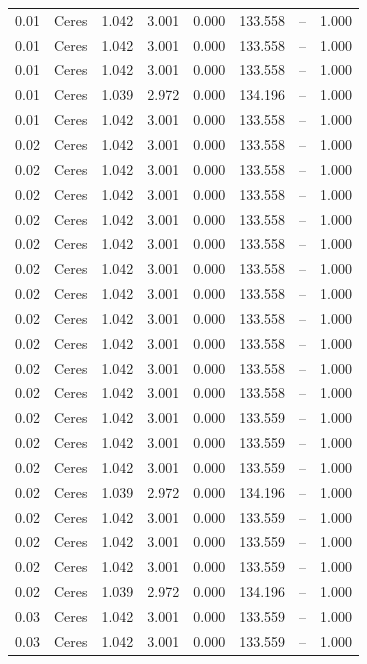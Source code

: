 \begin{table}[H]
\begin{tabular}{l c l l l}
0.01 & Ceres & 1.042 & 3.001 & 0.000 & 133.558 & -- & 1.000 \\
0.01 & Ceres & 1.042 & 3.001 & 0.000 & 133.558 & -- & 1.000 \\
0.01 & Ceres & 1.042 & 3.001 & 0.000 & 133.558 & -- & 1.000 \\
0.01 & Ceres & 1.039 & 2.972 & 0.000 & 134.196 & -- & 1.000 \\
0.01 & Ceres & 1.042 & 3.001 & 0.000 & 133.558 & -- & 1.000 \\
0.02 & Ceres & 1.042 & 3.001 & 0.000 & 133.558 & -- & 1.000 \\
0.02 & Ceres & 1.042 & 3.001 & 0.000 & 133.558 & -- & 1.000 \\
0.02 & Ceres & 1.042 & 3.001 & 0.000 & 133.558 & -- & 1.000 \\
0.02 & Ceres & 1.042 & 3.001 & 0.000 & 133.558 & -- & 1.000 \\
0.02 & Ceres & 1.042 & 3.001 & 0.000 & 133.558 & -- & 1.000 \\
0.02 & Ceres & 1.042 & 3.001 & 0.000 & 133.558 & -- & 1.000 \\
0.02 & Ceres & 1.042 & 3.001 & 0.000 & 133.558 & -- & 1.000 \\
0.02 & Ceres & 1.042 & 3.001 & 0.000 & 133.558 & -- & 1.000 \\
0.02 & Ceres & 1.042 & 3.001 & 0.000 & 133.558 & -- & 1.000 \\
0.02 & Ceres & 1.042 & 3.001 & 0.000 & 133.558 & -- & 1.000 \\
0.02 & Ceres & 1.042 & 3.001 & 0.000 & 133.558 & -- & 1.000 \\
0.02 & Ceres & 1.042 & 3.001 & 0.000 & 133.559 & -- & 1.000 \\
0.02 & Ceres & 1.042 & 3.001 & 0.000 & 133.559 & -- & 1.000 \\
0.02 & Ceres & 1.042 & 3.001 & 0.000 & 133.559 & -- & 1.000 \\
0.02 & Ceres & 1.039 & 2.972 & 0.000 & 134.196 & -- & 1.000 \\
0.02 & Ceres & 1.042 & 3.001 & 0.000 & 133.559 & -- & 1.000 \\
0.02 & Ceres & 1.042 & 3.001 & 0.000 & 133.559 & -- & 1.000 \\
0.02 & Ceres & 1.042 & 3.001 & 0.000 & 133.559 & -- & 1.000 \\
0.02 & Ceres & 1.039 & 2.972 & 0.000 & 134.196 & -- & 1.000 \\
0.03 & Ceres & 1.042 & 3.001 & 0.000 & 133.559 & -- & 1.000 \\
0.03 & Ceres & 1.042 & 3.001 & 0.000 & 133.559 & -- & 1.000 \\

\end{tabular}
\end{table}
